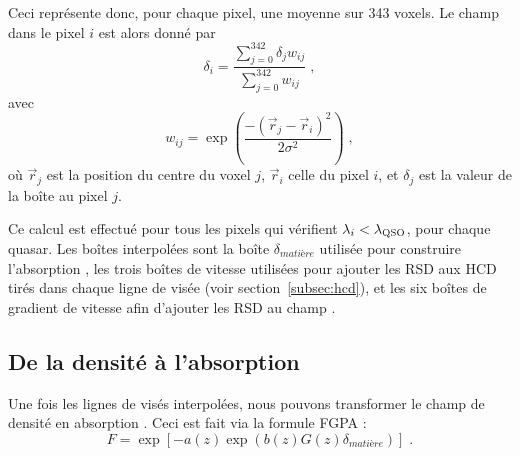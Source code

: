 \documentclass[11pt, twoside, a4paper, openright]{report}
\begin{document}
Ceci représente donc, pour chaque pixel, une moyenne sur \num{343} voxels.
Le champ dans le pixel $i$ est alors donné par
\begin{equation}
  \delta_i = \frac{
    \sum\limits_{j=0}^{342} \delta_j w_{ij}
  }{
    \sum\limits_{j=0}^{342} w_{ij}
  } \; ,
\end{equation}
avec
\begin{equation}
  w_{ij} = \exp(\frac{
    -(\vec r_j - \vec r_i)^2
  }{
    2 \sigma^2
  }) \; ,
\end{equation}
où $\vec r_j$ est la position du centre du voxel $j$, $\vec r_i$ celle du pixel $i$, et  $\delta_j$ est la valeur de la boîte au pixel $j$.

Ce calcul est effectué pour tous les pixels qui vérifient $\lambda_i < \lambda_{\textsc{QSO}}$, pour chaque quasar. Les boîtes interpolées sont la boîte $\delta_{matière}$ utilisée pour construire l'absorption \lya{}, les trois boîtes de vitesse utilisées pour ajouter les RSD aux HCD tirés dans chaque ligne de visée (voir section~\ref{subsec:hcd}), et les six boîtes de gradient de vitesse afin d'ajouter les RSD au champ \lya{}.


\subsection{De la densité à l'absorption}
\label{subsec:density2absorption}
Une fois les lignes de visés interpolées, nous pouvons transformer le champ de densité en absorption \lya{}. Ceci est fait via la formule FGPA :
\begin{equation}
  \label{eq:fgpa2}
  F = \exp\left[ - a(z) \exp(b(z) G(z) \delta_{matière})\right] \;.  
\end{equation}
\end{document}
